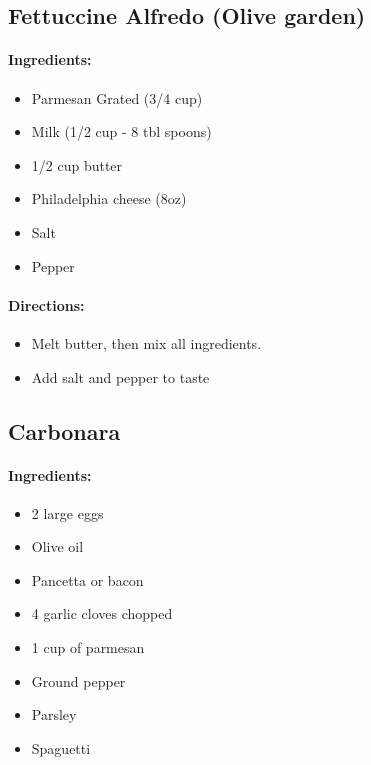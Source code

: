 \documentclass{article}
\begin{document}
\subsection{Fettuccine Alfredo (Olive garden)}

\paragraph{Ingredients:}

\begin{itemize}
  \item Parmesan Grated (3/4 cup)
  \item Milk (1/2 cup - 8 tbl spoons)
  \item 1/2 cup butter
  \item Philadelphia cheese (8oz)
  \item Salt
  \item Pepper
\end{itemize}

\paragraph{Directions:}
\begin{itemize}
  \item Melt butter, then mix all ingredients.
  \item Add salt and pepper to taste
\end{itemize}

\subsection{Carbonara}

\paragraph{Ingredients:}

\begin{itemize}
	\item 2 large eggs
	\item Olive oil
	\item Pancetta or bacon
	\item 4 garlic cloves chopped
	\item 1 cup of parmesan
	\item Ground pepper
	\item Parsley
	\item Spaguetti
\end{itemize}
\end{document}
